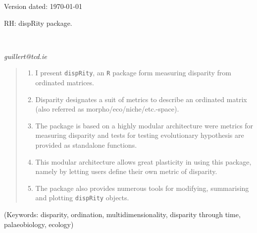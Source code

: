 \documentclass[12pt,letterpaper]{article}
\begin{document}
\begin{flushright}
Version dated: \today
\end{flushright}
\bigskip
\noindent RH: dispRity package.

\bigskip
\medskip
\begin{center}

\bigskip

\\
\end{center}
\medskip
{} \textit{guillert@tcd.ie}\\  
\vspace{1in}

\modulolinenumbers[1]
\linenumbers

%
%

\newpage
\begin{abstract}

\begin{enumerate}
    \item I present \texttt{dispRity}, an \texttt{R} package form measuring disparity from ordinated matrices. 
    \item Disparity designates a suit of metrics to describe an ordinated matrix (also referred as morpho/eco/niche/etc.-space).
    \item The package is based on a highly modular architecture were metrics for measuring disparity and tests for testing evolutionary hypothesis are provided as standalone functions.
    \item This modular architecture allows great plasticity in using this package, namely by letting users define their own metric of disparity.
    \item The package also provides numerous tools for modifying, summarising and plotting \texttt{dispRity} objects.
\end{enumerate}

\end{abstract}

\noindent (Keywords: disparity, ordination, multidimensionality, disparity through time, palaeobiology, ecology)\\
\end{document}
